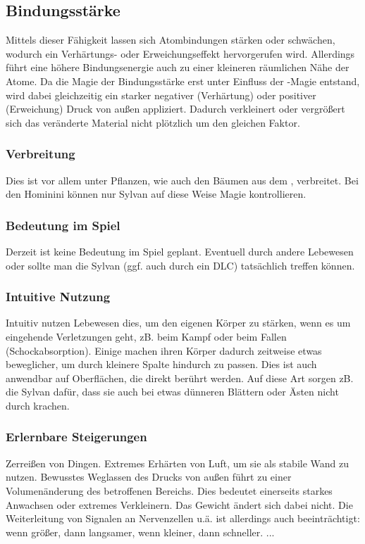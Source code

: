 \subsection{Bindungsstärke}\label{sec:bindungsmagie}
Mittels dieser Fähigkeit lassen sich Atombindungen stärken oder schwächen, wodurch ein Verhärtungs- oder Erweichungseffekt hervorgerufen wird. 
Allerdings führt eine höhere Bindungsenergie auch zu einer kleineren räumlichen Nähe der Atome. 
Da die Magie der Bindungsstärke erst unter Einfluss der -Magie entstand, wird dabei gleichzeitig ein starker negativer (Verhärtung) oder positiver (Erweichung) Druck von außen appliziert. 
Dadurch verkleinert oder vergrößert sich das veränderte Material nicht plötzlich um den gleichen Faktor.

\subsubsection{Verbreitung}
Dies ist vor allem unter Pflanzen, wie auch den Bäumen aus dem , verbreitet.
Bei den Hominini können nur Sylvan auf diese Weise Magie kontrollieren.

\subsubsection{Bedeutung im Spiel}
Derzeit ist keine Bedeutung im Spiel geplant. 
Eventuell durch andere Lebewesen oder sollte man die Sylvan (ggf. auch durch ein DLC) tatsächlich treffen können.

\subsubsection{Intuitive Nutzung}
Intuitiv nutzen Lebewesen dies, um den eigenen Körper zu stärken, wenn es um eingehende Verletzungen geht, zB. beim Kampf oder beim Fallen (Schockabsorption). 
Einige machen ihren Körper dadurch zeitweise etwas beweglicher, um durch kleinere Spalte hindurch zu passen.
Dies ist auch anwendbar auf Oberflächen, die direkt berührt werden. 
Auf diese Art sorgen zB. die Sylvan dafür, dass sie auch bei etwas dünneren Blättern oder Ästen nicht durch krachen.

\subsubsection{Erlernbare Steigerungen}
\begin{outline}
	\1 Zerreißen von Dingen.
	\1 Extremes Erhärten von Luft, um sie als stabile Wand zu nutzen.
	\1 Bewusstes Weglassen des Drucks von außen führt zu einer Volumenänderung des betroffenen Bereichs. 
	Dies bedeutet einerseits starkes Anwachsen oder extremes Verkleinern. 
	Das Gewicht ändert sich dabei nicht. 
	Die Weiterleitung von Signalen an Nervenzellen u.ä. ist allerdings auch beeinträchtigt: wenn größer, dann langsamer, wenn kleiner, dann schneller.
	\1 ...
\end{outline}

